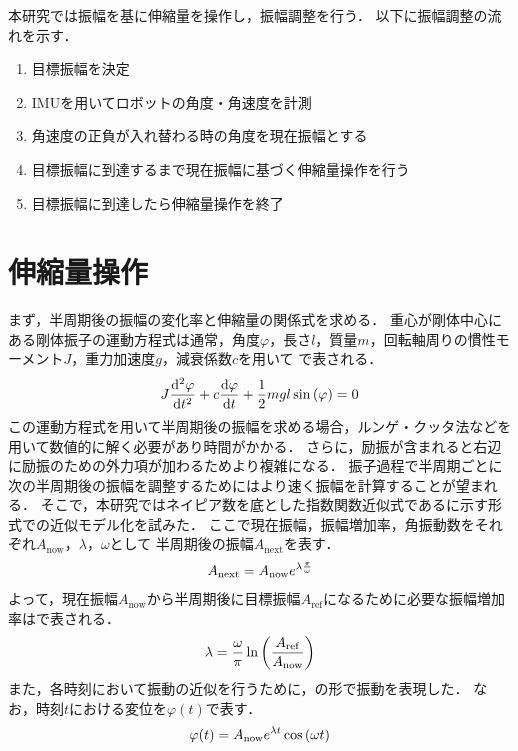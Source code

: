          本研究では振幅を基に伸縮量を操作し，振幅調整を行う．
          以下に振幅調整の流れを示す．
          \begin{enumerate}
            \item 目標振幅を決定
            \item IMUを用いてロボットの角度・角速度を計測
            \item 角速度の正負が入れ替わる時の角度を現在振幅とする
            \item 目標振幅に到達するまで現在振幅に基づく伸縮量操作を行う
            \item 目標振幅に到達したら伸縮量操作を終了
          \end{enumerate}

          \section{伸縮量操作}

          まず，半周期後の振幅の変化率と伸縮量の関係式を求める．
          重心が剛体中心にある剛体振子の運動方程式は通常，角度$\varphi$，長さ$l$，質量$m$，回転軸周りの慣性モーメント$J$，重力加速度$g$，減衰係数$c$を用いて
          で表される．
          \begin{eqnarray}
            \equlabel{equation}
            J \frac{\mathrm{d}^2 \varphi}{\mathrm{d} t^2} +c \frac{\mathrm{d}\varphi}{\mathrm{d} t}+\frac{1}{2}mgl \sin{(\varphi)}=0
          \end{eqnarray}
          この運動方程式を用いて半周期後の振幅を求める場合，ルンゲ・クッタ法などを用いて数値的に解く必要があり時間がかかる．
          さらに，励振が含まれると右辺に励振のための外力項が加わるためより複雑になる．
          振子過程で半周期ごとに次の半周期後の振幅を調整するためにはより速く振幅を計算することが望まれる．
          そこで，本研究ではネイピア数を底とした指数関数近似式であるに示す形式での近似モデル化を試みた．
          ここで現在振幅，振幅増加率，角振動数をそれぞれ$A_{\mathrm{now}}$，$\lambda$，$\omega$として
          半周期後の振幅$A_{\mathrm{next}}$を表す．
          \begin{eqnarray}
            \equlabel{Approximation Model1}
            A_{\mathrm{next}}=A_{\mathrm{now}}e^{\lambda \frac{\pi}{\omega}}
          \end{eqnarray}
          よって，現在振幅$A_{\mathrm{now}}$から半周期後に目標振幅$A_{\mathrm{ref}}$になるために必要な振幅増加率はで表される．
          \begin{eqnarray}
            \equlabel{lambda}
            \lambda=\frac{\omega}{\pi}\ln{\left(\frac{A_{\mathrm{ref}}}{A_{\mathrm{now}}}\right)}
          \end{eqnarray}
          また，各時刻において振動の近似を行うために，の形で振動を表現した．
          なお，時刻$t$における変位を$\varphi(t)$で表す．
          \begin{eqnarray}
            \equlabel{Approximation Model}
            \varphi(t)=A_{\mathrm{now}}e^{\lambda t}\cos{(\omega t)}
          \end{eqnarray}

